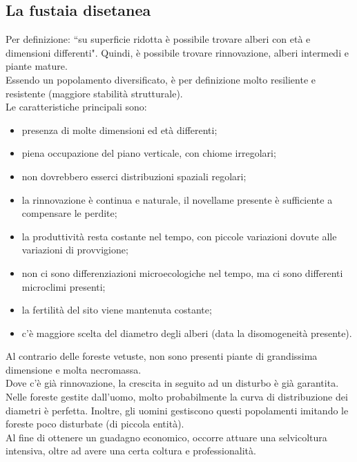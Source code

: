 \documentclass{article}
\begin{document}
\subsection{La fustaia disetanea} 
Per definizione: ``su superficie ridotta è possibile trovare alberi con età e dimensioni differenti". Quindi, è possibile trovare rinnovazione, alberi intermedi e piante mature.\\
Essendo un popolamento diversificato, è per definizione molto resiliente e resistente (maggiore stabilità strutturale).\\
Le caratteristiche principali sono:
\begin{itemize}
    \item presenza di molte dimensioni ed età differenti;
    \item piena occupazione del piano verticale, con chiome irregolari;
    \item non dovrebbero esserci distribuzioni spaziali regolari;
    \item la rinnovazione è continua e naturale, il novellame presente è sufficiente a compensare le perdite;
    \item la produttività resta costante nel tempo, con piccole variazioni dovute alle variazioni di provvigione;
    \item non ci sono differenziazioni microecologiche nel tempo, ma ci sono differenti microclimi presenti;
    \item la fertilità del sito viene mantenuta costante;
    \item c'è maggiore scelta del diametro degli alberi (data la disomogeneità presente).
\end{itemize}
Al contrario delle foreste vetuste, non sono presenti piante di grandissima dimensione e molta necromassa.\\
Dove c'è già rinnovazione, la crescita in seguito ad un disturbo è già garantita.\\
Nelle foreste gestite dall'uomo, molto probabilmente la curva di distribuzione dei diametri è perfetta. Inoltre, gli uomini gestiscono questi popolamenti imitando le foreste poco disturbate (di piccola entità).\\
Al fine di ottenere un guadagno economico, occorre attuare una selvicoltura intensiva, oltre ad avere una certa coltura e professionalità.
\end{document}
